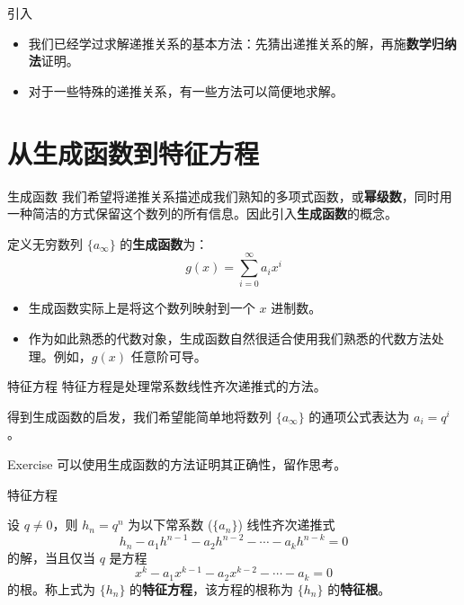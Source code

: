 \documentclass{beamer}
\begin{document}
\begin{frame}{引入}
    \begin{itemize}
        \item 我们已经学过求解递推关系的基本方法：先猜出递推关系的解，再施\textbf{数学归纳法}证明。
        \item 对于一些特殊的递推关系，有一些方法可以简便地求解。
    \end{itemize}
\end{frame}

\section{从生成函数到特征方程}

\begin{frame}{生成函数}
    我们希望将递推关系描述成我们熟知的多项式函数，或\textbf{幂级数}，同时用一种简洁的方式保留这个数列的所有信息。因此引入\textbf{生成函数}的概念。
    \begin{definition}
        定义无穷数列 $\{a_\infty\}$ 的\textbf{生成函数}为：
        $$
            g(x) = \sum_{i=0}^\infty a_ix^i
        $$
    \end{definition}
    \pause
    \begin{itemize}
        \item 生成函数实际上是将这个数列映射到一个 $x$ 进制数。
        \item 作为如此熟悉的代数对象，生成函数自然很适合使用我们熟悉的代数方法处理。例如，$g(x)$ 任意阶可导。
    \end{itemize}
\end{frame}

\begin{frame}{特征方程}
    特征方程是处理常系数线性齐次递推式的方法。

    得到生成函数的启发，我们希望能简单地将数列 $\{a_\infty\}$ 的通项公式表达为 $a_i = q^i$。
    \pause
    \begin{block}{Exercise}
        可以使用生成函数的方法证明其正确性，留作思考。
    \end{block}
\end{frame}

\begin{frame}{特征方程}
    \begin{theorem}[特征方程与特征根]
        设 $q \ne 0$，则 $h_n = q^n$ 为以下常系数 ($\{a_n\}$) 线性齐次递推式
        $$
            h_n - a_1h^{n-1} - a_2h^{n-2} - \cdots - a_kh^{n-k} = 0 
        $$
        的解，当且仅当 $q$ 是方程
        $$
            x^k - a_1x^{k-1}-a_2x^{k-2}-\cdots-a_k = 0
        $$
        的根。称上式为 $\{h_n\}$ 的\textbf{特征方程}，该方程的根称为 $\{h_n\}$ 的\textbf{特征根}。
    \end{theorem}
\end{frame}
\end{document}
